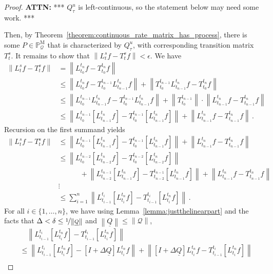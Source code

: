 \documentclass[10pt]{paper}
\theoremstyle{definition}
\newcommand{\processes}{\mathbb{P}}
\newcommand{\mprocesses}{\processes^{\mathrm{M}}}
\newcommand{\rateset}{\mathcal{Q}}
\newcommand{\lrate}{\underline{Q}}
\newcommand{\norm}[1]{\left\lVert #1 \right\rVert}
\begin{document}
\begin{proof}
{\bf ATTN:} *** $Q_\tau^u$ is left-continuous, so the statement below may need some work. ***

Then, by Theorem~\ref{theorem:continuous_rate_matrix_has_process}, there is some $P\in\mprocesses_\mathcal{Q}$ that is characterized by $Q_\tau^u$, with corresponding transition matrix $T_t^s$. It remains to show that $\norm{L_t^sf - T_t^sf}<\epsilon$. We have
\begin{align*}
\norm{L_t^sf - T_t^sf} &= \norm{L_{t_0}^{t_n}f - T_{t_0}^{t_n}f} \\
 &\leq \norm{L_{t_0}^{t_n}f - T_{t_0}^{t_{n-1}}L_{t_{n-1}}^{t_n}f} + \norm{T_{t_0}^{t_{n-1}}L_{t_{n-1}}^{t_n}f - T_{t_0}^{t_n}f} \\
 &\leq \norm{L_{t_0}^{t_{n-1}}L_{t_{n-1}}^{t_n}f - T_{t_0}^{t_{n-1}}L_{t_{n-1}}^{t_n}f} + \norm{{T_{t_0}^{t_{n-1}}}}\cdot\norm{L_{t_{n-1}}^{t_n}f - T_{t_{n-1}}^{t_n}f} \\
 &\leq \norm{L_{t_0}^{t_{n-1}}\left[L_{t_{n-1}}^{t_n}f\right] - T_{t_0}^{t_{n-1}}\left[L_{t_{n-1}}^{t_n}f\right]} + \norm{L_{t_{n-1}}^{t_n}f - T_{t_{n-1}}^{t_n}f} \,.
\end{align*}
Recursion on the first summand yields
\begin{align*}
\norm{L_t^sf - T_t^sf} &\leq \norm{L_{t_0}^{t_{n-1}}\left[L_{t_{n-1}}^{t_n}f\right] - T_{t_0}^{t_{n-1}}\left[L_{t_{n-1}}^{t_n}f\right]} + \norm{L_{t_{n-1}}^{t_n}f - T_{t_{n-1}}^{t_n}f} \\
 &\leq \norm{L_{t_0}^{t_{n-2}}\left[L_{t_{n-2}}^{t_n}f\right] - T_{t_0}^{t_{n-2}}\left[L_{t_{n-2}}^{t_n}f\right]} \\
 &\quad\quad\quad+ \norm{L_{t_{n-2}}^{t_{n-1}}\left[L_{t_{n-1}}^{t_n}f\right] - T_{t_{n-2}}^{t_{n-1}}\left[L_{t_{n-1}}^{t_n}f\right]} + \norm{L_{t_{n-1}}^{t_n}f - T_{t_{n-1}}^{t_n}f} \\
&\vdots \\
 &\leq \sum_{i=1}^{n} \norm{L_{t_{i-1}}^{t_i}\left[L_{t_i}^{t_n}f\right] - T_{t_{i-1}}^{t_i}\left[L_{t_i}^{t_n}f\right]}\,.
\end{align*}
For all $i\in\{1,\ldots,n\}$, we have using Lemma~\ref{lemma:justthelinearpart} and the facts that $\Delta<\delta\leq\nicefrac{1}{\norm{\lrate}}$ and $\norm{\lrate}\leq\norm{\rateset}$,
\begin{align*}
&\quad \norm{L_{t_{i-1}}^{t_i}\left[L_{t_i}^{t_n}f\right] - T_{t_{i-1}}^{t_i}\left[L_{t_i}^{t_n}f\right]} \\
&\leq \norm{L_{t_{i-1}}^{t_i}\left[L_{t_i}^{t_n}f\right] - \left[I+\Delta\lrate\right]L_{t_i}^{t_n}f} + \norm{\left[I+\Delta\lrate\right]L_{t_i}^{t_n}f - T_{t_{i-1}}^{t_i}\left[L_{t_i}^{t_n}f\right]} \\

\end{align*}
\end{proof}
\end{document}

